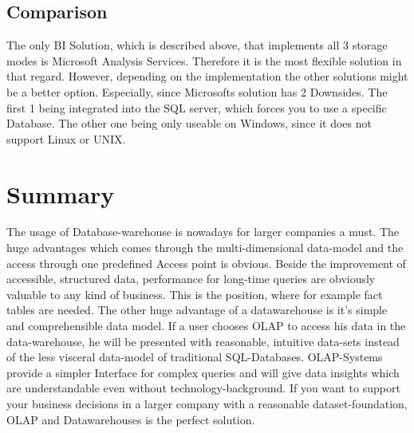 \documentclass[12pt,a4paper,oneside,
liststotoc, 					%
bibtotoc,						%
titlepage, 						%
headsepline, 					%
BCOR6mm,						%
openany,							%
]{scrreprt}
\begin{document}
\section{Comparison}\label{comparison}
The only BI Solution, which is described above, that implements all 3 storage modes is Microsoft Analysis Services. Therefore it is the most flexible solution in that regard. However, depending on the implementation the other solutions might be a better option. Especially, since Microsofts solution has 2 Downsides. The first 1 being integrated into the SQL server, which forces you to use a specific Database. The other one being only useable on Windows, since it does not support Linux or UNIX.
\chapter{Summary}
The usage of Database-warehouse is nowadays for larger companies a must. The huge advantages which comes through  the multi-dimensional data-model and the access through one predefined Access point is obvious. Beside the improvement of accessible, structured data, performance for long-time queries are obviously valuable to any kind of business. This is the position, where for example fact tables are needed. The other huge advantage of a datawarehouse is it's simple and comprehensible data model. If a user chooses OLAP to access his data in the data-warehouse, he will be presented with reasonable, intuitive data-sets instead of the less visceral data-model of traditional SQL-Databases. OLAP-Systems provide a simpler Interface for complex queries and will give data insights which are understandable even without technology-background. If you want to support your business decisions in a larger company with a reasonable dataset-foundation, OLAP and Datawarehouses is the perfect solution. 

\printbibliography
\begin{appendix}
\clearpage
{}						%
\end{appendix}
\end{document}

